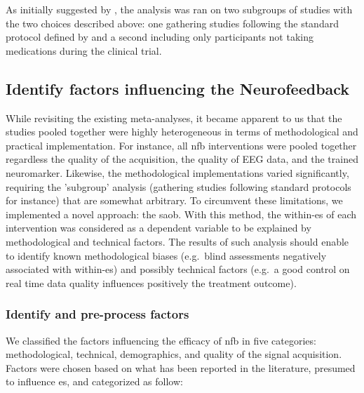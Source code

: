 As initially suggested by \citeauthor{Cortese2016}, the analysis was ran on two subgroups of studies 
with the two choices described above: one gathering studies following the standard protocol defined by 
\citet{Arns2014} and a second including only participants not taking medications during the clinical trial.

\subsection{Identify factors influencing the Neurofeedback}

While revisiting the existing meta-analyses, it became apparent to us that the studies pooled together were highly heterogeneous 
in terms of methodological and practical implementation. For instance, all \gls{nfb} 
interventions were pooled together regardless the quality of the acquisition, the quality of EEG data, and the trained 
neuromarker. Likewise, the methodological implementations varied significantly, requiring the 
'subgroup' analysis (gathering studies following standard protocols for instance) that are somewhat arbitrary. To circumvent these limitations, we 
implemented a novel approach: the \gls{saob}. With this method, the within-\gls{es} of each intervention was considered 
as a dependent variable to be explained by methodological and technical factors. The results 
of such analysis should enable to identify known methodological biases (e.g.\ blind assessments negatively associated 
with within-\gls{es}) and possibly technical factors (e.g.\ a good control on real time data quality influences positively the 
treatment outcome). 

\subsubsection{Identify and pre-process factors}

We classified the factors influencing the efficacy of \gls{nfb} in five categories: methodological, technical,
demographics, and quality of the signal acquisition. 
Factors were chosen based on what has been reported in the literature, presumed to influence \gls{es}, 
and categorized as follow:

